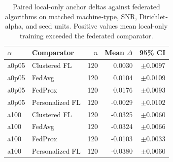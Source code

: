 \begin{table}[t]
\centering
\caption{Paired local-only anchor deltas against federated algorithms on matched machine-type, SNR, Dirichlet-alpha, and seed units. Positive values mean local-only training exceeded the federated comparator.}
\label{tab:p1-e2-local-anchor-deltas}
\scriptsize
\setlength{\tabcolsep}{3pt}
\begin{tabular}{@{}llrrr@{}}
\toprule
$\alpha$ & Comparator & $n$ & Mean $\Delta$ & 95\% CI \\
\midrule
a0p05 & Clustered FL & 120 & 0.0030 & $\pm$0.0097 \\
a0p05 & FedAvg & 120 & 0.0104 & $\pm$0.0109 \\
a0p05 & FedProx & 120 & 0.0176 & $\pm$0.0093 \\
a0p05 & Personalized FL & 120 & -0.0029 & $\pm$0.0102 \\
a100 & Clustered FL & 120 & -0.0325 & $\pm$0.0060 \\
a100 & FedAvg & 120 & -0.0324 & $\pm$0.0066 \\
a100 & FedProx & 120 & -0.0103 & $\pm$0.0033 \\
a100 & Personalized FL & 120 & -0.0380 & $\pm$0.0060 \\
\bottomrule
\end{tabular}
\end{table}
